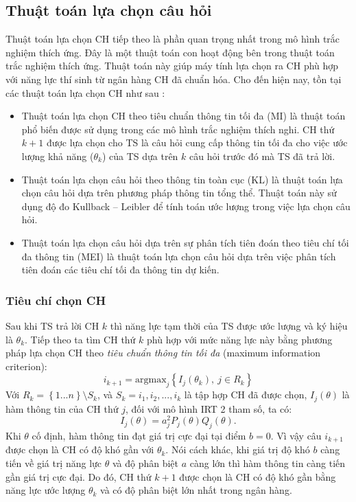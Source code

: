 \subsection{Thuật toán lựa chọn câu hỏi}
Thuật toán lựa chọn CH tiếp theo là phần quan trọng nhất trong mô hình trắc nghiệm thích ứng. Đây là một thuật toán con hoạt động bên trong thuật toán trắc nghiệm thích ứng. Thuật toán này giúp máy tính lựa chọn ra CH phù hợp với năng lực thí sinh từ ngân hàng CH đã chuẩn hóa. Cho đến hiện nay, tồn tại các thuật toán lựa chọn CH như sau \cite{tran2017ung}:
\begin{itemize}
	\item Thuật toán lựa chọn CH theo tiêu chuẩn thông tin tối đa (MI) là thuật toán phổ biến được sử dụng trong các mô hình trắc nghiệm thích nghi. CH thứ $k+1$ được lựa chọn cho TS là câu hỏi cung cấp thông tin tối đa cho việc ước lượng khả năng ($\theta_k$) của TS dựa trên $k$ câu hỏi trước đó mà TS đã trả lời.
	\item Thuật toán lựa chọn câu hỏi theo thông tin toàn cục (KL) là thuật toán lựa chọn câu hỏi dựa trên phương pháp thông tin tổng thể. Thuật toán này sử dụng độ đo Kullback – Leibler để tính toán ước lượng trong việc lựa chọn câu hỏi.
	\item Thuật toán lựa chọn câu hỏi dựa trên sự phân tích tiên đoán theo tiêu chí tối đa thông tin (MEI) là thuật toán lựa chọn câu hỏi dựa trên việc phân tích tiên đoán các tiêu chí tối đa thông tin dự kiến.
\end{itemize}\par

\subsubsection{Tiêu chí chọn CH}
Sau khi TS trả lời CH $k$ thì năng lực tạm thời của TS được ước lượng và ký hiệu là $\theta_{k}$. Tiếp theo ta tìm CH thứ $k$ phù hợp với mức năng lực này bằng phương pháp lựa chọn CH theo \textit{tiêu chuẩn thông tin tối đa} (maximum information criterion):
$$i_{k+1}=\mathrm{argmax}_j\left\{I_j\left(\theta_k\right),~j\in R_k\right\}$$
Với $R_k=\left\{1...n\right\}\setminus S_k$, và $S_k={i_1, i_2, ..., i_k}$ là tập hợp CH đã được chọn, $I_j(\theta)$ là hàm thông tin của CH thứ $j$, đối với mô hình IRT 2 tham số, ta có:
$$I_j(\theta)=a_j^2P_j(\theta)Q_j(\theta).$$
Khi $\theta$ cố định, hàm thông tin đạt giá trị cực đại tại điểm $b=0$. Vì vậy câu $i_{k+1}$ được chọn là CH có độ khó gần với $\theta_k$. Nói cách khác, khi giá trị độ khó $b$ càng tiến về giá trị năng lực $\theta$ và độ phân biệt $a$ càng lớn thì hàm thông tin càng tiến gần giá trị cực đại. Do đó, CH thứ $k+1$ được chọn là CH có độ khó gần bằng năng lực ước lượng $\theta_k$ và có độ phân biệt lớn nhất trong ngân hàng.\par

